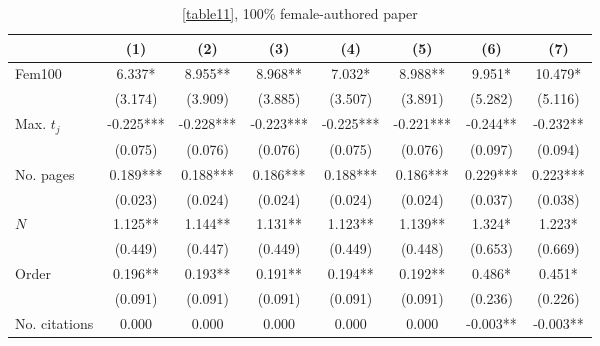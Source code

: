 \begin{table}
    \begin{adjustwidth}{-0.085cm}{}
    \footnotesize
    \centering
    \begin{threeparttable}
        \caption{\autoref{table11}, 100\% female-authored paper}
        \label{table11XA}
        \begin{tabular}{p{2.64cm}SSSSSSS}
            \toprule
            &{(1)}&{(2)}&{(3)}&{(4)}&{(5)}&{(6)}&{(7)}\\
            \midrule
            Fem100                        &       6.337*  &       8.955** &       8.968** &       7.032*  &       8.988** &       9.951*  &      10.479*  \\
                                          &     (3.174)   &     (3.909)   &     (3.885)   &     (3.507)   &     (3.891)   &     (5.282)   &     (5.116)   \\
            Max. \(t_j\)                  &      -0.225***&      -0.228***&      -0.223***&      -0.225***&      -0.221***&      -0.244** &      -0.232** \\
                                          &     (0.075)   &     (0.076)   &     (0.076)   &     (0.075)   &     (0.076)   &     (0.097)   &     (0.094)   \\
            No. pages                     &       0.189***&       0.188***&       0.186***&       0.188***&       0.186***&       0.229***&       0.223***\\
                                          &     (0.023)   &     (0.024)   &     (0.024)   &     (0.024)   &     (0.024)   &     (0.037)   &     (0.038)   \\
            \(N\)                         &       1.125** &       1.144** &       1.131** &       1.123** &       1.139** &       1.324*  &       1.223*  \\
                                          &     (0.449)   &     (0.447)   &     (0.449)   &     (0.449)   &     (0.448)   &     (0.653)   &     (0.669)   \\
            Order                         &       0.196** &       0.193** &       0.191** &       0.194** &       0.192** &       0.486*  &       0.451*  \\
                                          &     (0.091)   &     (0.091)   &     (0.091)   &     (0.091)   &     (0.091)   &     (0.236)   &     (0.226)   \\
            No. citations                 &       0.000   &       0.000   &       0.000   &       0.000   &       0.000   &      -0.003** &      -0.003** \\

\end{tabular}
\end{threeparttable}
\end{adjustwidth}
\end{table}
